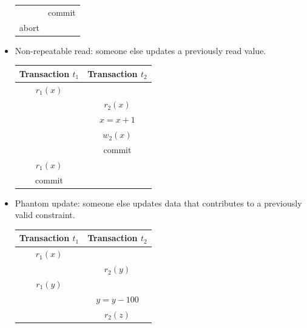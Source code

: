 \documentclass[12pt, a4paper]{report}
\newtheorem[style=M,bodystyle=\normalfont]{theorem}{Theorem}
\newtheorem[style=M,bodystyle=\normalfont]{corollary}{Corollary}
\newtheorem[style=M,bodystyle=\normalfont]{lemma}{Lemma}
\newtheorem[style=M,bodystyle=\normalfont]{definition}{Definition}
\begin{document}
\begin{itemize}
\begin{table}[H]
\begin{tabular}{c|c}
                                        & commit                     \\
                abort                      &                           
                \end{tabular}
            \end{table}
        \item Non-repeatable read: someone else updates a previously read value.
            \begin{table}[H]
                \centering
                \begin{tabular}{c|c}
                \textbf{Transaction $t_1$}  & \textbf{Transaction $t_2$} \\ \hline
                $r_1(x)$                    &                            \\
                                            & $r_2(x)$                   \\
                                            & $x=x+1$                    \\
                                            & $w_2(x)$                   \\
                                            & commit                     \\
                $r_1(x)$                    &                            \\
                commit                      & \multicolumn{1}{l}{}      
                \end{tabular}
            \end{table}
        \item Phantom update: someone else updates data that contributes to a previously valid constraint. 
            \begin{table}[H]
                \centering
                \begin{tabular}{c|c}
                \textbf{Transaction $t_1$} & \textbf{Transaction $t_2$} \\ \hline
                $r_1(x)$                   &                            \\
                                           & $r_2(y)$                   \\
                $r_1(y)$                   &                            \\
                                           & $y=y-100$                  \\
                                           & $r_2(z)$                   \\

\end{tabular}
\end{table}
\end{itemize}
\end{document}
